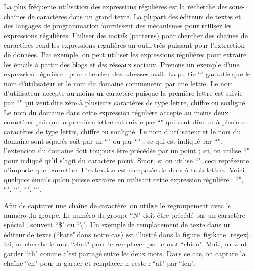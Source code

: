 \documentclass{KodeBook}
\begin{document}
La plus fréquente utilisation des expressions régulières est la recherche des sous-chaînes de caractères dans un grand texte.
La plupart des éditeurs de textes et des langages de programmation fournissent des mécanismes pour utiliser les expressions régulières.
Utiliser des motifs (patterns) pour chercher des chaînes de caractères rend les expressions régulières un outil très puissant pour l'extraction de données.
Par exemple, on peut utiliser les expressions régulières pour extraire les émails à partir des blogs et des réseaux sociaux.
Prenons un exemple d'une expression régulière :  pour chercher des adresses mail.
La partie ``\expword{[a-zA-Z]}" garantie que le nom d'utilisateur et le nom du domaine commencent par une lettre.
Le nom d'utilisateur accepte au moins un caractère puisque la première lettre est suivie par ``" qui veut dire zéro à plusieurs caractères de type lettre, chiffre ou souligné.
Le nom du domaine dans cette expression régulière accepte au moins deux caractères puisque la première lettre est suivie par ``" qui veut dire un à plusieurs caractères de type lettre, chiffre ou souligné.
Le nom d'utilisateur et le nom du domaine sont séparés soit par un ``" ou par ``" ; ce qui est indiqué par ``".
l'extension du domaine doit toujours être précédée par un point ; ici, on utilise ``" pour indiqué qu'il s'agit du caractère point.
Sinon, si on utilise ``", ceci représente n'importe quel caractère.
L'extension est composée de deux à trois lettres.
Voici quelques émails qu'on puisse extraire en utilisant cette expression régulière : 
``", ``", ``", ``", ``".


Afin de capturer une chaîne de caractère, on utilise le regroupement avec le numéro du groupe.
Le numéro du groupe ``N" doit être précédé par un caractère spécial , souvent ``\$" ou ``\textbackslash".
Un exemple de remplacement de texte dans un éditeur de texte (``kate" dans notre cas) est illustré dans la figure \ref{fig:kate_regex}.
Ici, on cherche le mot ``chat" pour le remplacer par le mot ``chien". 
Mais, on veut garder ``ch" comme c'est partagé entre les deux mots.
Dans ce cas, on capture la chaîne ``ch" pour la garder et remplacer le reste : ``at" par ``ien".
\end{document}
